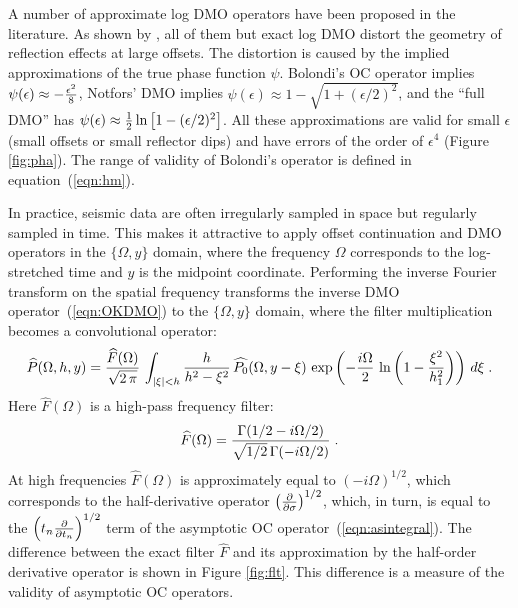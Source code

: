 A number of approximate log DMO operators have been proposed in the
literature. As shown by \cite{GEO55-05-05950607}, all of them but
exact log DMO distort the geometry of reflection effects at large
offsets. The distortion is caused by the implied approximations of the
true phase function $\psi$. Bolondi's OC operator
\cite[]{GPR30-06-08130828} implies $\psi(\epsilon) \approx -{\epsilon^2
  \over 8}$, Notfors' DMO \cite[]{GEO52-12-17181721} implies
$\psi(\epsilon) \approx 1 - \sqrt{1+(\epsilon /2)^2}$, and the ``full
DMO'' \cite[]{SEG-1987-S14.1} has $\psi(\epsilon) \approx {1 \over 2}
\ln\left[1-(\epsilon / 2)^2\right]$. All these approximations are
valid for small $\epsilon$ (small offsets or small reflector dips) and
have errors of the order of $\epsilon^4$ (Figure \ref{fig:pha}).  The
range of validity of Bolondi's operator is defined in
equation~(\ref{eqn:hm}).
  
  
  In practice, seismic data are often irregularly sampled in space but
  regularly sampled in time. This makes it attractive to apply offset
  continuation and DMO operators in the $\{\Omega,y\}$ domain, where
  the frequency $\Omega$ corresponds to the log-stretched time and
  $y$ is the midpoint coordinate. Performing the inverse Fourier
  transform on the spatial frequency transforms the inverse DMO
  operator~(\ref{eqn:OKDMO}) to the $\{\Omega,y\}$ domain, where the
  filter multiplication becomes a convolutional operator:
\begin{equation}
\widehat{P}(\Omega,h,y) =
{\widehat{F}(\Omega) \over \sqrt{2\,\pi}}\,\int_{|\xi|<h}
{ h \over {h^2-\xi^2}}\,
\widehat{P_0}(\Omega,y-\xi)\,
\exp\left(-{i\Omega \over 2}\,\ln\left(1-{\xi^2 \over h_1^2}\right)\right) 
\,d\xi\;.
\label{eqn:OXDMO} 
\end{equation}
Here $\widehat{F}(\Omega)$ is a high-pass frequency filter:
\begin{equation}
\widehat{F}(\Omega)={{\Gamma(1/2-i\Omega/2)}
\over {\sqrt{1/2}\,\Gamma(-i\Omega/ 2)}}\;.
\label{eqn:hat} 
\end{equation}
At high frequencies $\widehat{F}(\Omega)$ is approximately equal to
$(- i \Omega)^{1/2}$, which corresponds to the half-derivative
operator $\left(\partial \over \partial \sigma \right)^{1/2}$, which,
in turn, is equal to the $\left(t_n {\partial \over \partial t_n}
\right)^{1/2}$ term of the asymptotic OC
operator~(\ref{eqn:asintegral}). The difference between the exact
filter $\widehat{F}$ and its approximation by the half-order
derivative operator is shown in Figure \ref{fig:flt}. This difference
is a measure of the validity of asymptotic OC operators.

